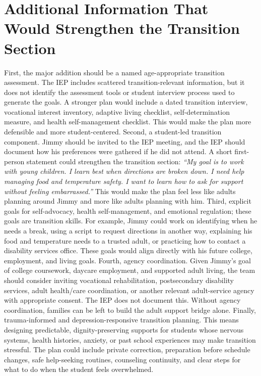 \documentclass[11pt]{article}
\begin{document}
\section{Additional Information That Would Strengthen the Transition Section}

First, the major addition should be a named age-appropriate transition assessment. The IEP includes scattered transition-relevant information, but it does not identify the assessment tools or student interview process used to generate the goals. A stronger plan would include a dated transition interview, vocational interest inventory, adaptive living checklist, self-determination measure, and health self-management checklist. This would make the plan more defensible and more student-centered. Second, a student-led transition component. Jimmy should be invited to the IEP meeting, and the IEP should document how his preferences were gathered if he did not attend. A short first-person statement could strengthen the transition section: \textit{``My goal is to work with young children. I learn best when directions are broken down. I need help managing food and temperature safety. I want to learn how to ask for support without feeling embarrassed.''} This would make the plan feel less like adults planning around Jimmy and more like adults planning with him. Third, explicit goals for self-advocacy, health self-management, and emotional regulation; these goals are transition skills. For example, Jimmy could work on identifying when he needs a break, using a script to request directions in another way, explaining his food and temperature needs to a trusted adult, or practicing how to contact a disability services office. These goals would align directly with his future college, employment, and living goals. Fourth, agency coordination. Given Jimmy's goal of college coursework, daycare employment, and supported adult living, the team should consider inviting vocational rehabilitation, postsecondary disability services, adult health/care coordination, or another relevant adult-service agency with appropriate consent. The IEP does not document this. Without agency coordination, families can be left to build the adult support bridge alone. Finally, trauma-informed and depression-responsive transition planning. This means designing predictable, dignity-preserving supports for students whose nervous systems, health histories, anxiety, or past school experiences may make transition stressful. The plan could include private correction, preparation before schedule changes, safe help-seeking routines, counseling continuity, and clear steps for what to do when the student feels overwhelmed.
\end{document}
